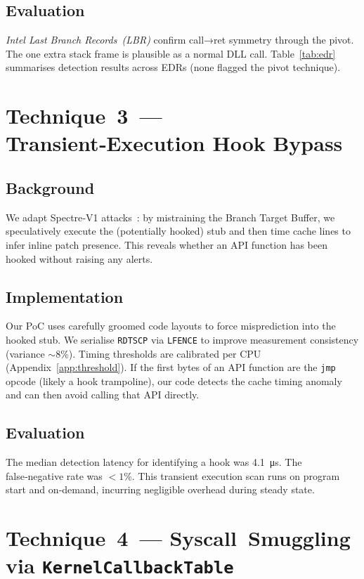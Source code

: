 \documentclass[11pt,letterpaper]{article}
\begin{document}
\subsection{Evaluation}
\emph{Intel Last Branch Records (LBR)} confirm call→ret symmetry through the pivot. The one extra stack frame is plausible as a normal DLL call. Table~\ref{tab:edr} summarises detection results across EDRs (none flagged the pivot technique).

\section{Technique 3 — Transient‑Execution Hook Bypass}
\label{sec:spec}
\subsection{Background}
We adapt Spectre‑V1 attacks~\cite{Kocher2019Spectre}: by mistraining the Branch Target Buffer, we speculatively execute the (potentially hooked) stub and then time cache lines to infer inline patch presence. This reveals whether an API function has been hooked without raising any alerts.

\subsection{Implementation}
Our PoC uses carefully groomed code layouts to force misprediction into the hooked stub. We serialise \texttt{RDTSCP} via \texttt{LFENCE} to improve measurement consistency (variance $\sim$8\%). Timing thresholds are calibrated per CPU (Appendix \ref{app:threshold}). If the first bytes of an API function are the \texttt{jmp} opcode (likely a hook trampoline), our code detects the cache timing anomaly and can then avoid calling that API directly.

\subsection{Evaluation}
The median detection latency for identifying a hook was \SI{4.1}{\micro\second}. The false‑negative rate was $<1$\%. This transient execution scan runs on program start and on‑demand, incurring negligible overhead during steady state.

\section{Technique 4 — Syscall Smuggling via \texttt{KernelCallbackTable}}
\label{sec:kct}
\end{document}
